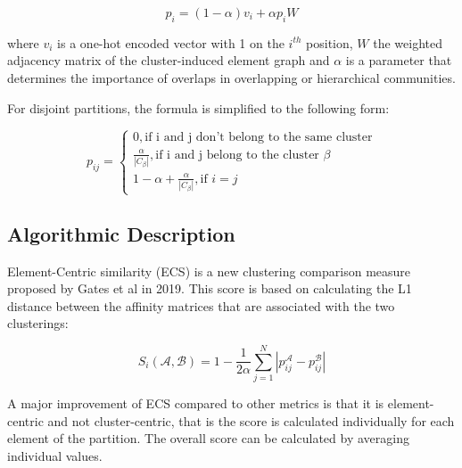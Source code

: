     \[ p_i = (1 - \alpha) v_i + \alpha p_i W \]

where $v_i$ is a one-hot encoded vector with 1 on the $i^{th}$ position, $W$ the weighted adjacency matrix of the cluster-induced element graph and $\alpha$ is a parameter that determines the importance of overlaps in overlapping or hierarchical communities.

For disjoint partitions, the formula is simplified to the following form:

    \begin{equation} \label{eq:affinity-disjoin}
        p_{ij} = 
        \begin{cases}
            0, \text{if i and j don't belong to the same cluster} \\
            \frac{\alpha}{|C_\beta|}, \text{if i and j belong to the cluster } \beta \\
            1 - \alpha + \frac{\alpha}{|C_\beta|}, \text{if } i = j
        \end{cases}
    \end{equation}
    
\subsection{Algorithmic Description}

Element-Centric similarity (ECS) is a new clustering comparison measure proposed by Gates et al \cite{Gates2019} in 2019. This score is based on calculating the L1 distance between the affinity matrices that are associated with the two clusterings:

    \begin{equation} \label{eq:def-ecs}
        S_i (\mathcal{A}, \mathcal{B}) = 1 - \frac{1}{2 \alpha} \sum_{j = 1}^N |p_{ij}^{\mathcal{A}} - p_{ij}^{\mathcal{B}} | 
    \end{equation}

A major improvement of ECS compared to other metrics is that it is element-centric and not cluster-centric, that is the score is calculated individually for each element of the partition. The overall score can be calculated by averaging individual values.

